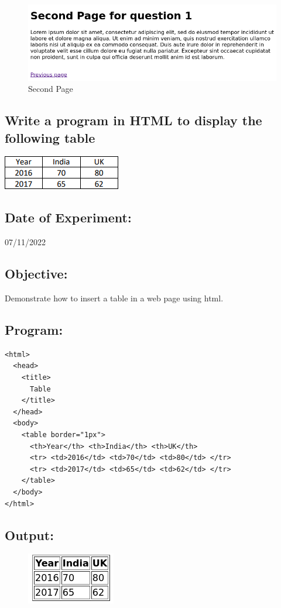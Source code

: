 \documentclass[12pt, a4paper]{article}
\begin{document}
\begin{figure}[h]
  \centering
  \includegraphics[width=\textwidth]{2}
  \caption{Second Page}
\end{figure}

\pagebreak

\begin{tcolorbox}
  \section{Write a program in HTML to display the following table}
  \hskip28pt\includegraphics{3}
\end{tcolorbox}
\subsection*{Date of Experiment:}
07/11/2022
\subsection*{Objective:}
Demonstrate how to insert a table in a web page using html.

\subsection*{Program:}
\begin{lstlisting}
<html>
  <head>
    <title>
      Table
    </title>
  </head>
  <body>
    <table border="1px">
      <th>Year</th> <th>India</th> <th>UK</th>
      <tr> <td>2016</td> <td>70</td> <td>80</td> </tr>
      <tr> <td>2017</td> <td>65</td> <td>62</td> </tr>
    </table>
  </body>
</html>
\end{lstlisting}
\subsection*{Output:}
\begin{figure}[ht]
  \centering
  \includegraphics{4}
\end{figure}
\end{document}
